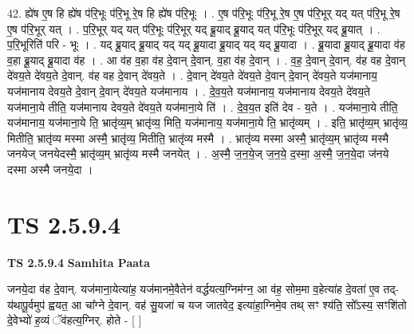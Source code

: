 \documentclass[17pt]{extarticle}
\begin{document}
42. ह्ये॑ष ए॒ष हि ह्ये॑ष प॑रि॒भूः प॑रि॒भू रे॒ष हि ह्ये॑ष प॑रि॒भूः । . ए॒ष प॑रि॒भूः प॑रि॒भू रे॒ष ए॒ष प॑रि॒भूर् यद् यत् प॑रि॒भू रे॒ष ए॒ष प॑रि॒भूर् यत् । . प॒रि॒भूर् यद् यत् प॑रि॒भूः प॑रि॒भूर् यद् ब्रू॒याद् ब्रू॒याद् यत् प॑रि॒भूः प॑रि॒भूर् यद् ब्रू॒यात् । . प॒रि॒भूरिति॑ परि - भूः । . यद् ब्रू॒याद् ब्रू॒याद् यद् यद् ब्रू॒यादा ब्रू॒याद् यद् यद् ब्रू॒यादा । . ब्रू॒यादा ब्रू॒याद् ब्रू॒यादा व॑ह व॒हा ब्रू॒याद् ब्रू॒यादा व॑ह । . आ व॑ह व॒हा व॑ह दे॒वान् दे॒वान्. व॒हा व॑ह दे॒वान् । . व॒ह॒ दे॒वान् दे॒वान्. व॑ह वह दे॒वान् दे॑वय॒ते दे॑वय॒ते दे॒वान्. व॑ह वह दे॒वान् दे॑वय॒ते । . दे॒वान् दे॑वय॒ते दे॑वय॒ते दे॒वान् दे॒वान् दे॑वय॒ते यज॑मानाय॒ यज॑मानाय देवय॒ते दे॒वान् दे॒वान् दे॑वय॒ते यज॑मानाय । . दे॒व॒य॒ते यज॑मानाय॒ यज॑मानाय देवय॒ते दे॑वय॒ते यज॑माना॒ये तीति॒ यज॑मानाय देवय॒ते दे॑वय॒ते यज॑माना॒ये ति॑ । . दे॒व॒य॒त इति॑ देव - य॒ते । . यज॑माना॒ये तीति॒ यज॑मानाय॒ यज॑माना॒ये ति॒ भ्रातृ॑व्य॒म् भ्रातृ॑व्य॒ मिति॒ यज॑मानाय॒ यज॑माना॒ये ति॒ भ्रातृ॑व्यम् । . इति॒ भ्रातृ॑व्य॒म् भ्रातृ॑व्य॒ मितीति॒ भ्रातृ॑व्य मस्मा अस्मै॒ भ्रातृ॑व्य॒ मितीति॒ भ्रातृ॑व्य मस्मै । . भ्रातृ॑व्य मस्मा अस्मै॒ भ्रातृ॑व्य॒म् भ्रातृ॑व्य मस्मै जनयेज् जनयेदस्मै॒ भ्रातृ॑व्य॒म् भ्रातृ॑व्य मस्मै जनयेत् । . अ॒स्मै॒ ज॒न॒ये॒ज् ज॒न॒ये॒ द॒स्मा॒ अ॒स्मै॒ ज॒न॒ये॒दा ज॑नये दस्मा अस्मै जनये॒दा । \newline
\pagebreak
{}
\section*{ TS 2.5.9.4 }

\textbf{TS 2.5.9.4 } \newline
\textbf{Samhita Paata} \newline

जनये॒दा व॑ह दे॒वान्. यज॑माना॒येत्या॑ह॒ यज॑मानमे॒वैतेन॑ वर्द्धयत्य॒ग्निम॑ग्न॒ आ व॑ह॒ सोम॒मा व॒हेत्या॑ह दे॒वता॑ ए॒व तद्-य॑थापू॒र्वमुप॑ ह्वयत॒ आ चा᳚ग्ने दे॒वान्. वह॑ सु॒यजा॑ च यज जातवेद॒ इत्या॑हा॒ग्निमे॒व तथ् सꣳ श्य॑ति॒ सो᳚ऽस्य॒ सꣳशि॑तो दे॒वेभ्यो॑ ह॒व्यं ॅव॑हत्य॒ग्निर्. होते - [  ] \newline
\end{document}
